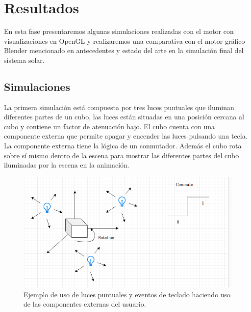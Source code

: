 \documentclass[a4paper, 17pt]{book}
\begin{document}

\cleardoublepage
\chapter{Resultados}

En esta fase presentaremos algunas simulaciones realizadas con el motor con visualizaciones en OpenGL y realizaremos una comparativa
con el motor gráfico Blender mencionado en antecedentes y estado del arte en la simulación final del sistema solar.

\section{Simulaciones}
\label{sec:Simulaciones}

La primera simulación está compuesta por tres luces puntuales que iluminan diferentes partes de un cubo, las luces están situadas
en una posición cercana al cubo y contiene un factor de atenuación bajo. El cubo cuenta con una componente externa que permite
apagar y encender las luces pulsando una tecla. La componente externa tiene la lógica de un conmutador. Además el cubo rota sobre
sí mismo dentro de la escena para mostrar las diferentes partes del cubo iluminadas por la escena en la animación.

\begin{figure}[H]
    \centering
    \includegraphics[scale=0.50, keepaspectratio]{img/SimpleCube.png}
    \caption{Ejemplo de uso de luces puntuales y eventos de teclado haciendo uso de las componentes externas del usuario.}
    \label{figura:SimpleCube}
\end{figure}
\end{document}
